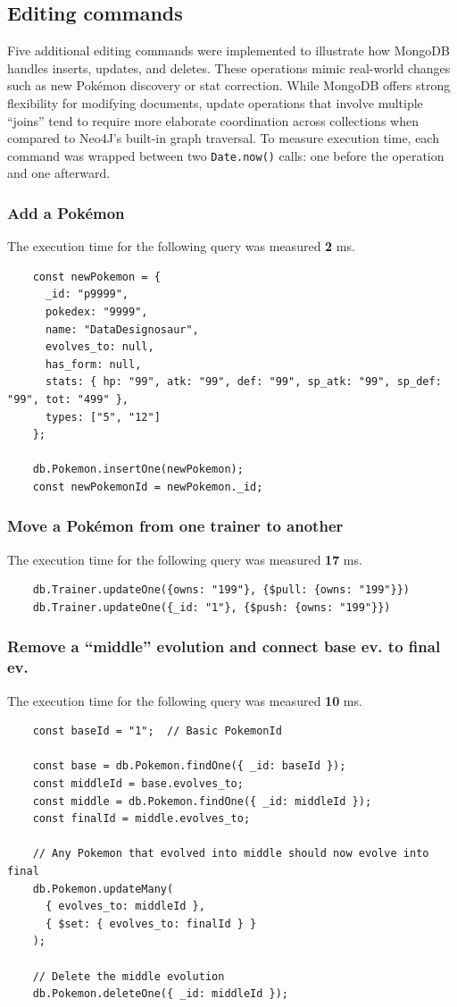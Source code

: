\documentclass[11pt]{article}
\begin{document}
    \subsection{Editing commands}
    Five additional editing commands were implemented to illustrate how MongoDB handles inserts, updates, and deletes. 
    These operations mimic real-world changes such as new Pokémon discovery or stat correction.
    While MongoDB offers strong flexibility for modifying documents, update operations that involve multiple “joins” tend to require more elaborate coordination across collections when compared to Neo4J’s built-in graph traversal.
    To measure execution time, each command was wrapped between two \texttt{Date.now()} calls: one before the operation and one afterward.

    \subsubsection{Add a Pokémon}
    The execution time for the following query was measured \textbf{2} ms.
    \begin{lstlisting}
    const newPokemon = {
      _id: "p9999",
      pokedex: "9999",
      name: "DataDesignosaur",
      evolves_to: null,
      has_form: null,
      stats: { hp: "99", atk: "99", def: "99", sp_atk: "99", sp_def: "99", tot: "499" },
      types: ["5", "12"]
    };

    db.Pokemon.insertOne(newPokemon);
    const newPokemonId = newPokemon._id;
    \end{lstlisting}

    \subsubsection{Move a Pokémon from one trainer to another}
    The execution time for the following query was measured \textbf{17} ms.
    \begin{lstlisting}
    db.Trainer.updateOne({owns: "199"}, {$pull: {owns: "199"}})
    db.Trainer.updateOne({_id: "1"}, {$push: {owns: "199"}})
    \end{lstlisting}

    \subsubsection{Remove a “middle” evolution and connect base ev. to final ev.}
    The execution time for the following query was measured \textbf{10} ms.
    \begin{lstlisting}
    const baseId = "1";  // Basic PokemonId
    
    const base = db.Pokemon.findOne({ _id: baseId });
    const middleId = base.evolves_to;
    const middle = db.Pokemon.findOne({ _id: middleId });
    const finalId = middle.evolves_to;
    
    // Any Pokemon that evolved into middle should now evolve into final
    db.Pokemon.updateMany(
      { evolves_to: middleId },
      { $set: { evolves_to: finalId } }
    );
    
    // Delete the middle evolution
    db.Pokemon.deleteOne({ _id: middleId });
    \end{lstlisting}
\end{document}
